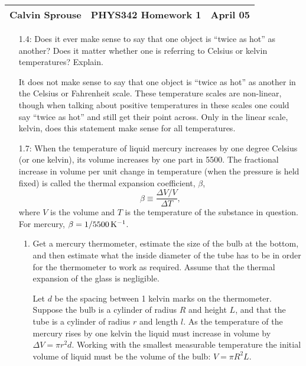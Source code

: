 \documentclass[a4paper, 12pt]{config/homework}
\begin{document}
\noindent
\begin{tabularx}{\textwidth}{>{\centering\arraybackslash}X>{\centering\arraybackslash}X>{\centering\arraybackslash}X}
Calvin Sprouse & PHYS342 Homework 1 & 2024 April 05\\
\midrule
\end{tabularx}

\vspace{\baselineskip}
\begin{enumerate}
\item[1.4:] Does it ever make sense to say that one object is ``twice as hot'' as another? Does it matter whether one is referring to Celsius or kelvin temperatures? Explain.

It does not make sense to say that one object is ``twice as hot'' as another in the Celsius or Fahrenheit scale. These temperature scales are non-linear, though when talking about positive temperatures in these scales one could say ``twice as hot'' and still get their point across. Only in the linear scale, kelvin, does this statement make sense for all temperatures.

\vspace{\baselineskip}
\item[1.7:] When the temperature of liquid mercury increases by one degree Celsius (or one kelvin), its volume increases by one part in 5500. The fractional increase in volume per unit change in temperature (when the pressure is held fixed) is called the thermal expansion coefficient, \(\beta\),
\[\beta \equiv \frac{\Delta V / V}{\Delta T},\]
where \(V\) is the volume and \(T\) is the temperature of the substance in question. For mercury, \(\beta=\qty[parse-numbers=false]{1/5500}{\per\kelvin}\).
\begin{enumerate}[label=(\alph*.)]
\item Get a mercury thermometer, estimate the size of the bulb at the bottom, and then estimate what the inside diameter of the tube has to be in order for the thermometer to work as required. Assume that the thermal expansion of the glass is negligible.

Let \(d\) be the spacing between 1 kelvin marks on the thermometer. Suppose the bulb is a cylinder of radius \(R\) and height \(L\), and that the tube is a cylinder of radius \(r\) and length \(l\). As the temperature of the mercury rises by one kelvin the liquid must increase in volume by \(\Delta V = \pi r^2 d\). Working with the smallest measurable temperature the initial volume of liquid must be the volume of the bulb: \(V=\pi R^2 L\).


\end{enumerate}
\end{enumerate}
\end{document}
